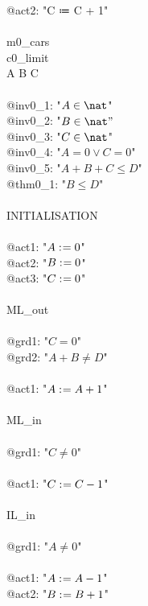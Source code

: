 \begin{description}
\begin{center}
\begin{Bcode}
			@act2: "C ≔ C + 1"\\
			\Bend\\
			\Bend
			\else
			\Bmachine{} m0_cars\\
			\Bsees{} c0_limit\\
			\Bvariables{} A B C\\
			\Binvariants\\
			\Btab @inv0_1: "\(A \in \nat\)"\\
			\Btab @inv0_2: "\(B \in \nat"\)\\
			\Btab @inv0_3: "\(C \in \nat\)"\\
			\Btab @inv0_4: "\(A = 0 \vee C = 0\)"\\
			\Btab @inv0_5: "\(A + B + C \leq D\)"\\
			\Btab @thm0_1: "\(B \leq D\)" \Btheorem\\
			\Bevents\\
			\Btab INITIALISATION\\
			\Btab \Bbegin\\
			\Btab \Btab @act1: "\(A \mathrel{:\mkern1mu=} 0\)"\\
			\Btab \Btab @act2: "\(B \mathrel{:\mkern1mu=} 0\)"\\
			\Btab \Btab @act3: "\(C \mathrel{:\mkern1mu=} 0\)"\\
			\Btab \Bend\\
			\Btab ML_out\\
			\Btab \Bwhen\\
			\Btab \Btab @grd1: "\(C = 0\)"\\
			\Btab \Btab @grd2: "\(A + B \neq D\)"\\
			\Btab \Bthen\\
			\Btab \Btab @act1: "\(A \mathrel{:\mkern1mu=} A + 1\)"\\
			\Btab \Bend\\
			\Btab ML_in\\
			\Btab \Bwhen\\
			\Btab \Btab @grd1: "\(C \neq 0\)"\\
			\Btab \Bthen\\
			\Btab \Btab @act1: "\(C \mathrel{:\mkern1mu=} C - 1\)"\\
			\Btab \Bend\\
			\Btab IL_in\\
			\Btab \Bwhen\\
			\Btab \Btab @grd1: "\(A \neq 0\)"\\
			\Btab \Bthen\\
			\Btab \Btab @act1: "\(A \mathrel{:\mkern1mu=} A - 1\)"\\
			\Btab \Btab @act2: "\(B \mathrel{:\mkern1mu=} B + 1\)"\\

\end{Bcode}
\end{center}
\end{description}
